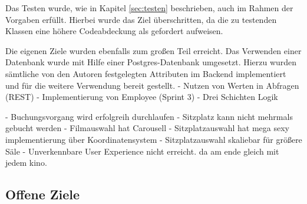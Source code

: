 Das Testen wurde, wie in Kapitel \vref{sec:testen} beschrieben, auch im Rahmen der Vorgaben erfüllt. Hierbei wurde das Ziel überschritten, da die zu testenden Klassen eine höhere Codeabdeckung als gefordert aufweisen.

Die eigenen Ziele wurden ebenfalls zum großen Teil erreicht. Das Verwenden einer Datenbank wurde mit Hilfe einer Postgres-Datenbank umgesetzt.
Hierzu wurden sämtliche von den Autoren festgelegten Attributen im Backend implementiert und für die weitere Verwendung bereit gestellt.
- Nutzen von Werten in Abfragen (REST)
- Implementierung von Employee (Sprint 3)
- Drei Schichten Logik

- Buchungsvorgang wird erfolgreih durchlaufen
- Sitzplatz kann nicht mehrmals gebucht werden
- Filmauswahl hat Carousell
- Sitzplatzauswahl hat mega sexy implementierung über Koordinatensystem
- Sitzplatzauswahl skaliebar für größere Säle
- Unverkennbare User Experience nicht erreicht. da am ende gleich mit jedem kino.


\subsection{Offene Ziele}